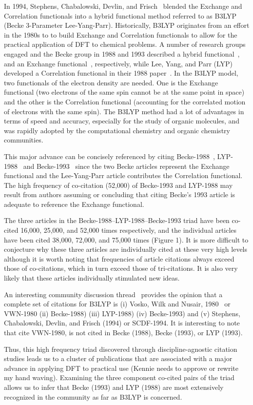 \documentclass[11pt, oneside]{article}   	%
\begin{document}
In 1994, Stephens, Chabalowski, Devlin, and Frisch~\citep{stephens1994ab} blended the Exchange and Correlation functionals into a hybrid functional method referred to as B3LYP (Becke 3-Parameter Lee-Yang-Parr). Historically, B3LYP originates from an effort in the 1980s to to build Exchange and Correlation functionals to allow for the practical application of DFT to chemical problems. A number of research groups engaged and the Becke group in 1988 and 1993 described a hybrid functional~\citep{becke1988density}, and an Exchange functional~\citep{becke1993dft}, respectively, while Lee, Yang, and Parr (LYP) developed a Correlation functional in their 1988 paper~\citep{lyp1988}.  In the B3LYP model, two functionals of the electron density are needed. One is the Exchange functional (two electrons of the same spin cannot be at the same point in space) and the other is the Correlation functional (accounting for the correlated motion of electrons with the same spin). The B3LYP method had a lot of advantages in terms of speed and accuracy, especially for the study of organic molecules, and was rapidly adopted by the computational chemistry and organic chemistry communities.

This major advance can be concisely referenced by citing Becke-1988~\citep{becke1988density}, LYP-1988~\citep{lyp1988} and Becke-1993~\citep{becke1993dft} since the two Becke articles represent the Exchange functional and the Lee-Yang-Parr article contributes the Correlation functional. The high frequency of co-citation (52,000) of Becke-1993 and LYP-1988 may result from authors assuming or concluding that citing Becke's 1993 article is adequate to reference the Exchange functional. 

The three articles in the Becke-1988--LYP-1988--Becke-1993 triad have been co-cited 16,000, 25,000, and 52,000 times respectively, and the individual articles have been cited 38,000, 72,000, and 75,000 times (Figure 1). It is more difficult to conjecture why these three articles are individually cited at these very high levels although it is worth noting that  frequencies of article citations always exceed those of co-citations, which in turn exceed those of tri-citations. It is also very likely that these articles individually stimulated new ideas.

An interesting community discussion thread~\citep{johansson2002} provides the opinion that a complete set of citations for B3LYP is (i) Vosko, Wilk and Nusair, 1980~\citep{vosko1980accurate} or VWN-1980 (ii) Becke-1988) (iii) LYP-1988) (iv) Becke-1993) and (v) Stephens, Chabalowski, Devlin, and Frisch (1994) or SCDF-1994. It is interesting to note that  cite VWN-1980, is not cited in Becke (1988), Becke (1993), or LYP (1993). 

Thus, this high frequency triad discovered through discipline-agnostic citation studies leads us to a cluster of publications that are associated with a major advance in applying DFT to practical use (Kennie needs to approve or rewrite my hand waving). Examining the three component co-cited pairs of the triad allows us to infer that Becke (1993) and LYP (1988) are most extensively recognized in the community as far as B3LYP is concerned. 

%

\end{document}

